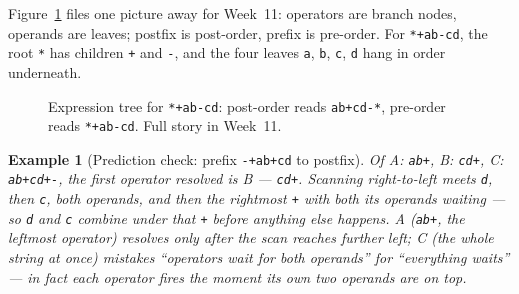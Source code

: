 \documentclass[11pt]{article}
\newtheorem{example}{Example}[section]
\begin{document}
Figure~\ref{fig:exptree} files one picture away for Week~11: operators are branch nodes, operands are leaves; postfix is post-order, prefix is pre-order. For \texttt{*+ab-cd}, the root \texttt{*} has children \texttt{+} and \texttt{-}, and the four leaves \texttt{a}, \texttt{b}, \texttt{c}, \texttt{d} hang in order underneath.

\begin{figure}[h]
  \centering
  \caption{Expression tree for \texttt{*+ab-cd}: post-order reads \texttt{ab+cd-*}, pre-order reads \texttt{*+ab-cd}. Full story in Week~11.}
  \label{fig:exptree}
\end{figure}

\begin{example}[Prediction check: prefix \texttt{-+ab+cd} to postfix]
Of A: \texttt{ab+}, B: \texttt{cd+}, C: \texttt{ab+cd+-}, the first operator resolved is B --- \texttt{cd+}. Scanning right-to-left meets \texttt{d}, then \texttt{c}, both operands, and then the rightmost \texttt{+} with both its operands waiting --- so \texttt{d} and \texttt{c} combine under that \texttt{+} before anything else happens. A (\texttt{ab+}, the leftmost operator) resolves only after the scan reaches further left; C (the whole string at once) mistakes ``operators wait for both operands'' for ``everything waits'' --- in fact each operator fires the moment its own two operands are on top.
\end{example}
\end{document}
